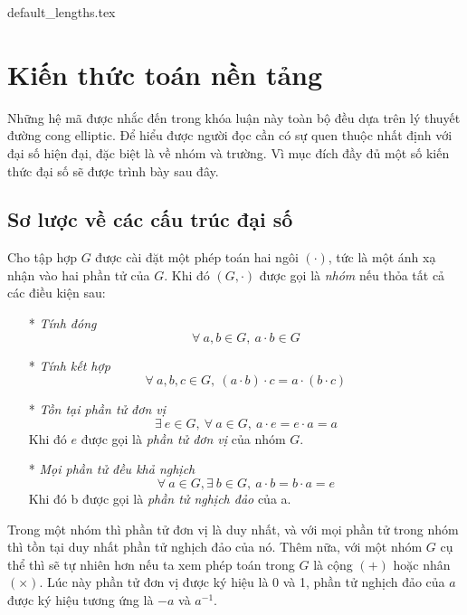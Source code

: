 \documentclass[class=report, crop=false]{standalone}
\begin{document}
	{default_lengths.tex}
	\chapter{Kiến thức toán nền tảng}\label{chap:3}
		Những hệ mã được nhắc đến trong khóa luận này toàn bộ đều dựa trên lý thuyết đường cong elliptic. Để hiểu được người đọc cần có sự quen thuộc nhất định với đại số hiện đại, đặc biệt là về nhóm và trường. Vì mục đích đầy đủ một số kiến thức đại số sẽ được trình bày sau đây.
	\section{Sơ lược về các cấu trúc đại số}
		\begin{definition}
			Cho tập hợp $G$ được cài đặt một phép toán hai ngôi $(\cdot)$, tức là một ánh xạ nhận vào hai phần tử của $G$. Khi đó $(G, \cdot)$ được gọi là \textit{nhóm} nếu thỏa tất cả các điều kiện sau:
			\vspace{-0.5cm}
			\begin{itemize}
				\item[*] \textit{Tính đóng}
				\[
					\forall\ a, b \in G, \ a \cdot b \in G
				\]
				\item[*] \textit{Tính kết hợp}
				\[
					\forall\ a, b, c \in G, \ (a \cdot b) \cdot c = a \cdot (b \cdot c)
				\]
				\item[*] \textit{Tồn tại phần tử đơn vị}
				\[
					\exists\ e \in G, \ \forall\ a \in G, \ a \cdot e = e \cdot a = a
				\]
				Khi đó $e$ được gọi là \textit{phần tử đơn vị} của nhóm $G$.
				\item[*] \textit{Mọi phần tử đều khả nghịch}
				\[
					\forall\ a \in G, \exists\ b \in G, \ a \cdot b = b \cdot a = e
				\]
				Khi đó b được gọi là \textit{phần tử nghịch đảo} của a.
			\end{itemize}
		\end{definition}
		\begin{remark}
			Trong một nhóm thì phần tử đơn vị là duy nhất, và với mọi phần tử trong nhóm thì tồn tại duy nhất phần tử nghịch đảo của nó. Thêm nữa, với một nhóm $G$ cụ thể thì sẽ tự nhiên hơn nếu ta xem phép toán trong $G$ là cộng $(+)$ hoặc nhân $(\times)$. Lúc này phần tử đơn vị được ký hiệu là 0 và 1, phần tử nghịch đảo của $a$ được ký hiệu tương ứng là $-a$ và $a^{-1}$.
		\end{remark}
		
\end{document}
